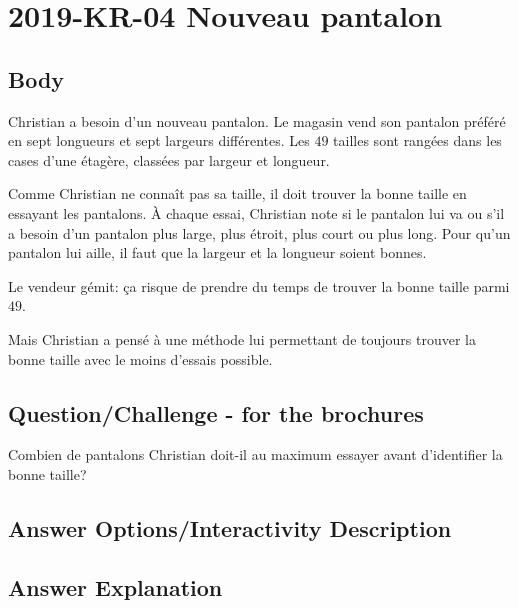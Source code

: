 \documentclass[a4paper,11pt]{report}
\newcommand{\taskGraphicsFolder}{..}
\begin{document}
\section*{\centering{} 2019-KR-04 Nouveau pantalon}


\subsection*{Body}

Christian a besoin d’un nouveau pantalon. Le magasin vend son pantalon préféré en sept longueurs et sept largeurs différentes. Les $49$ tailles sont rangées dans les cases d’une étagère, classées par largeur et longueur.

Comme Christian ne connaît pas sa taille, il doit trouver la bonne taille en essayant les pantalons. À chaque essai, Christian note si le pantalon lui va ou s’il a besoin d’un pantalon plus large, plus étroit, plus court ou plus long. Pour qu’un pantalon lui aille, il faut que la largeur et la longueur soient bonnes.

\raisebox{-0.5ex}{}


Le vendeur gémit: ça risque de prendre du temps de trouver la bonne taille parmi $49$.

Mais Christian a pensé à une méthode lui permettant de toujours trouver la bonne taille avec le moins d’essais possible.

{\em


\subsection*{Question/Challenge - for the brochures}

Combien de pantalons Christian doit-il au maximum essayer avant d’identifier la bonne taille?

}

\begingroup
\renewcommand{\arraystretch}{1.5}
\subsection*{Answer Options/Interactivity Description}



\endgroup

\subsection*{Answer Explanation}
\end{document}
